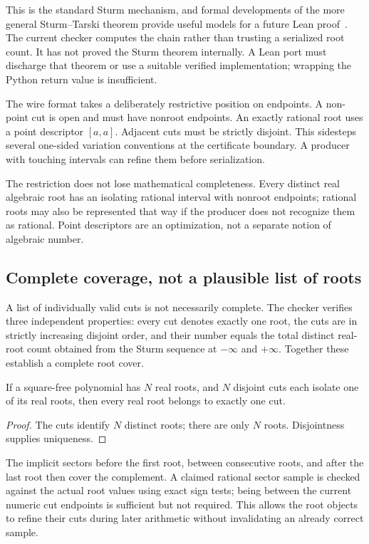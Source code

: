 This is the standard Sturm mechanism, and formal developments of the more general Sturm--Tarski theorem provide useful models for a future Lean proof~\cite{sturm-tarski}. The current checker computes the chain rather than trusting a serialized root count. It has not proved the Sturm theorem internally. A Lean port must discharge that theorem or use a suitable verified implementation; wrapping the Python return value is insufficient.

The wire format takes a deliberately restrictive position on endpoints. A non-point cut is open and must have nonroot endpoints. An exactly rational root uses a point descriptor $[a,a]$. Adjacent cuts must be strictly disjoint. This sidesteps several one-sided variation conventions at the certificate boundary. A producer with touching intervals can refine them before serialization.

The restriction does not lose mathematical completeness. Every distinct real algebraic root has an isolating rational interval with nonroot endpoints; rational roots may also be represented that way if the producer does not recognize them as rational. Point descriptors are an optimization, not a separate notion of algebraic number.

\subsection{Complete coverage, not a plausible list of roots}
A list of individually valid cuts is not necessarily complete. The checker verifies three independent properties: every cut denotes exactly one root, the cuts are in strictly increasing disjoint order, and their number equals the total distinct real-root count obtained from the Sturm sequence at $-\infty$ and $+\infty$. Together these establish a complete root cover.

\begin{lemma}
If a square-free polynomial has $N$ real roots, and $N$ disjoint cuts each isolate one of its real roots, then every real root belongs to exactly one cut.
\end{lemma}
\begin{proof}
The cuts identify $N$ distinct roots; there are only $N$ roots. Disjointness supplies uniqueness.
\end{proof}

The implicit sectors before the first root, between consecutive roots, and after the last root then cover the complement. A claimed rational sector sample is checked against the actual root values using exact sign tests; being between the current numeric cut endpoints is sufficient but not required. This allows the root objects to refine their cuts during later arithmetic without invalidating an already correct sample.

